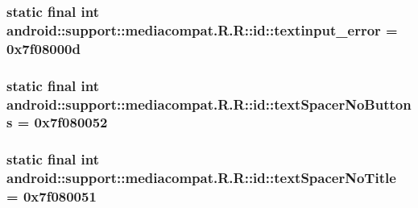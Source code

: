 \hypertarget{classandroid_1_1support_1_1mediacompat_1_1_r_1_1id_2c717714be04dabb58a1fc06349de737}{
\subsubsection[{textinput\_\-error}]{\setlength{\rightskip}{0pt plus 5cm}static final int android::support::mediacompat.R.R::id::textinput\_\-error = 0x7f08000d}}
\label{classandroid_1_1support_1_1mediacompat_1_1_r_1_1id_2c717714be04dabb58a1fc06349de737}


\hypertarget{classandroid_1_1support_1_1mediacompat_1_1_r_1_1id_2412beffa50cd1b30db94edbb470a62c}{
\subsubsection[{textSpacerNoButtons}]{\setlength{\rightskip}{0pt plus 5cm}static final int android::support::mediacompat.R.R::id::textSpacerNoButtons = 0x7f080052}}
\label{classandroid_1_1support_1_1mediacompat_1_1_r_1_1id_2412beffa50cd1b30db94edbb470a62c}


\hypertarget{classandroid_1_1support_1_1mediacompat_1_1_r_1_1id_8df9d3930493dac232f7c7dff48a3947}{
\subsubsection[{textSpacerNoTitle}]{\setlength{\rightskip}{0pt plus 5cm}static final int android::support::mediacompat.R.R::id::textSpacerNoTitle = 0x7f080051}}
\label{classandroid_1_1support_1_1mediacompat_1_1_r_1_1id_8df9d3930493dac232f7c7dff48a3947}


